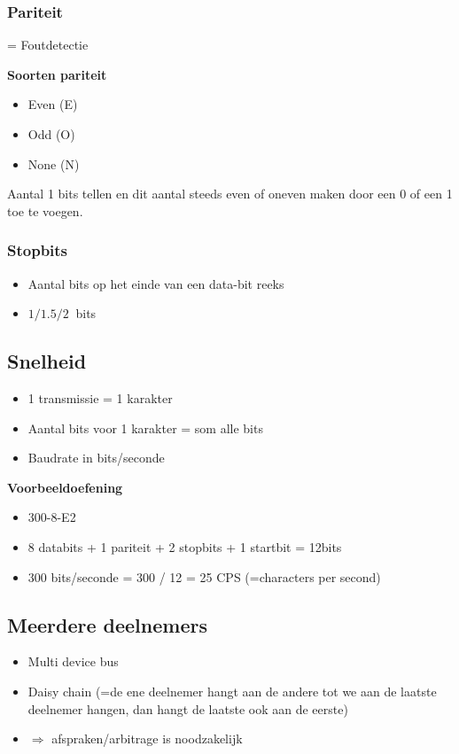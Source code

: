 \documentclass{article}
\newcommand{\bold}[1]{\textbf{#1}}
\begin{document}
\subsubsection{Pariteit}
= Foutdetectie

\bold{Soorten pariteit}
\begin{itemize}
    \item Even (E)
    \item Odd (O)
    \item None (N)
\end{itemize}

Aantal 1 bits tellen en dit aantal steeds even of oneven maken door een 0 of een 1 toe te voegen.

\subsubsection{Stopbits}
\begin{itemize}
    \item Aantal bits op het einde van een data-bit reeks
    \item $1/1.5/2\ $ bits
\end{itemize}

\subsection{Snelheid}
\begin{itemize}
    \item 1 transmissie = 1 karakter
    \item Aantal bits voor 1 karakter = som alle bits
    \item Baudrate in bits/seconde
\end{itemize}

\bold{Voorbeeldoefening}
\begin{itemize}
    \item 300-8-E2
    \item 8 databits + 1 pariteit + 2 stopbits + 1 startbit = 12bits
    \item 300 bits/seconde = 300 / 12 = 25 CPS (=characters per second)
\end{itemize}

\subsection{Meerdere deelnemers}
\begin{itemize}
    \item Multi device bus
    \item Daisy chain (=de ene deelnemer hangt aan de andere tot we aan de laatste deelnemer hangen, dan hangt de laatste ook aan de eerste)
    \item $\Rightarrow$ afspraken/arbitrage is noodzakelijk
\end{itemize}
\end{document}
